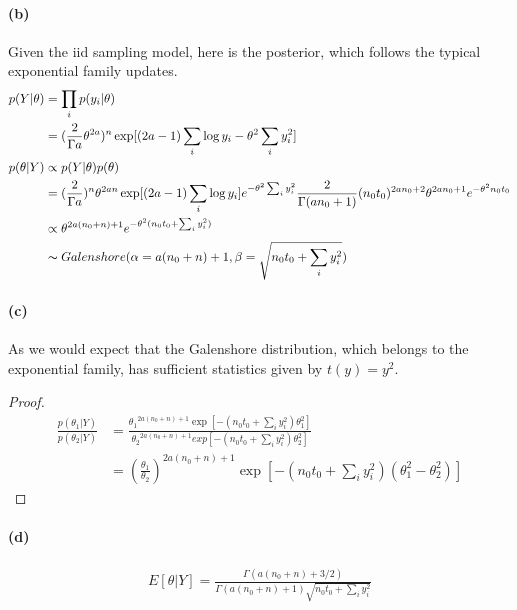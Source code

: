 \documentclass[11pt, letterpaper]{article}
\begin{document}
\paragraph{(b)}
Given the iid sampling model, here is the posterior, which follows the typical exponential family updates.
\begin{align*}
    p(Y|\theta)
        &= \prod_i p(y_i|\theta) \\
        &= (\frac{2}{\Gamma{a}} \theta^{2a})^n \exp[(2a-1) \sum_i \log y_i - \theta^2 \sum_i y_i^2] \\
    p(\theta|Y) &\propto p(Y|\theta) p(\theta) \\
        &=
            (\frac{2}{\Gamma{a}})^n \theta^{2an} \exp[(2a-1) \sum_i \log y_i] e^{- \theta^2 \sum_i y_i^2}
            \frac{2}{\Gamma(an_0 + 1)} (n_0 t_0)^{2a n_0 + 2} \theta^{2an_0+1} e^{-\theta^2 n_0 t_0} \\
        &\propto \theta^{2a(n_0+n)+1} e^{-\theta^2(n_0 t_0 + \sum_i y_i^2)} \\
        &\thicksim Galenshore(\alpha = a (n_0+n) + 1, \beta = \sqrt{n_0 t_0 + \sum_i y_i^2})
\end{align*}

\paragraph{(c)}
As we would expect that the Galenshore distribution, which belongs to the exponential family, has sufficient statistics given by $t(y) = y^2$.
\begin{proof}
\begin{align*}
    \frac{p(\theta_1|Y)}{p(\theta_2|Y)}
        &= \frac{{\theta_1}^{2a(n_0+n)+1} \exp[-(n_0t_0+\sum_i y_i^2)\theta_1^2]}{{\theta_2}^{2a(n_0+n)+1} exp[-(n_0t_0+\sum_i y_i^2)\theta_2^2]} \\
        &= ({\frac{\theta_1}{\theta_2}})^{2a(n_0+n)+1} \exp[-(n_0t_0+\sum_i y_i^2)(\theta_1^2 - \theta_2^2)]
\end{align*}
\end{proof}

\paragraph{(d)}
\begin{align*}
    E[\theta|Y] = \frac{\Gamma(a(n_0+n)+3/2)}{\Gamma(a(n_0+n)+1) \sqrt{n_0t_0 + \sum_i y_i^2}}
\end{align*}
\end{document}
